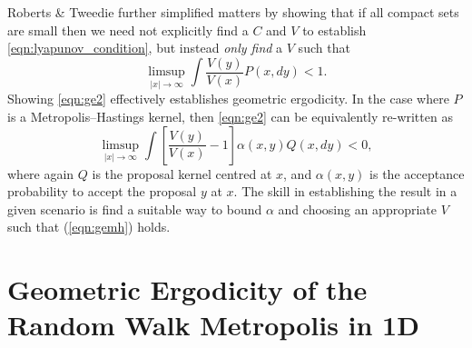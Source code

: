 \documentclass{article}
\begin{document}
Roberts \& Tweedie \cite{roberts1996geometric} further simplified matters by showing that if all compact sets are small then we need not explicitly find a $C$ and $V$ to establish \eqref{eqn:lyapunov_condition}, but instead \emph{only find} a $V$ such that
\begin{equation} \label{eqn:ge2}
\limsup_{|x| \to \infty} \int \frac{V(y)}{V(x)} P(x,dy) < 1.
\end{equation}
Showing \eqref{eqn:ge2} effectively  establishes geometric ergodicity.  In the case where $P$ is a Metropolis--Hastings kernel, then \eqref{eqn:ge2} can be equivalently re-written as
\begin{equation} \label{eqn:gemh}
\limsup_{|x| \to \infty} \int \left[ \frac{V(y)}{V(x)} - 1 \right] \alpha(x,y)Q(x,dy) < 0,
\end{equation}
where again $Q$ is the proposal kernel centred at $x$, and $\alpha(x,y)$ is the acceptance probability to accept the proposal $y$ at $x$.  The skill in establishing the result in a given scenario is find a suitable way to bound $\alpha$ and choosing an appropriate $V$ such that (\ref{eqn:gemh}) holds.

\section{Geometric Ergodicity of the Random Walk Metropolis in 1D}
\end{document}
